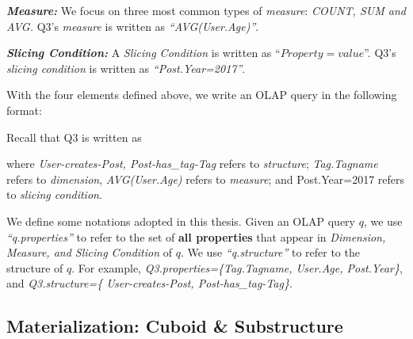 \noindent\textbf{\textit{Measure:}} We focus on three most common types of \textit{measure}: \textit{COUNT, SUM and AVG. } Q3's \textit{measure} is written as \textit{``AVG(User.Age)''}.


\noindent\textbf{\textit{Slicing Condition:}} A \textit{Slicing Condition} is written as ``$Property = value$''. Q3's \textit{slicing condition} is written as \textit{``Post.Year=2017''}.

\noindent With the four elements defined above, we write an OLAP query in the following format:


\noindent Recall that Q3 is written as 


\noindent where \textit{User-creates-Post, Post-has\_tag-Tag} refers to  \textit{structure}; \textit{Tag.Tagname} refers to \textit{dimension},\textit{ AVG(User.Age) } refers to \textit{measure}; and {Post.Year=2017} refers to \textit{slicing condition}. 



\par
We define some notations adopted in this thesis. Given an OLAP query $q$, we use \textit{``q.properties''} to refer to the set of \textbf{all properties} that appear in \textit{Dimension, Measure, and Slicing Condition} of $q$. We use \textit{``q.structure''} to refer to the structure of $q$. For example, \textit{Q3.properties=\{Tag.Tagname, User.Age, Post.Year\}}, and \textit{Q3.structure=\{ User-creates-Post, Post-has\_tag-Tag\}}.



\subsection{Materialization: Cuboid \& Substructure}
\label{Materialization: Cuboid vs Substructures}



